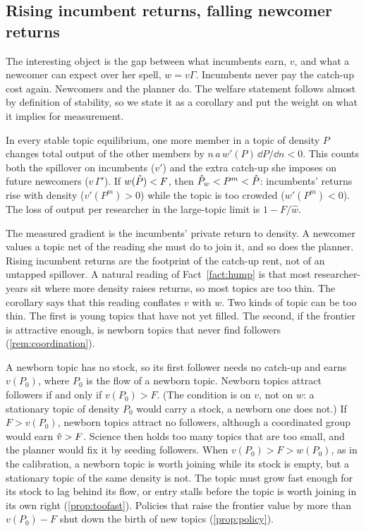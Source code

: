 \subsection{Rising incumbent returns, falling newcomer returns}

The interesting object is the gap between what incumbents earn, $v$, and what a
newcomer can expect over her spell, $w=v\Gamma$. Incumbents never pay the
catch-up cost again. Newcomers and the planner do. The welfare statement
follows almost by definition of stability, so we state it as a corollary and
put the weight on what it implies for measurement.

\begin{corollary}\label{cor:overcrowd}
In every stable topic equilibrium, one more member in a topic of density $P$
changes total output of the other members by $n\,a\,w'(P)\,\dd P/\dd n<0$.
This counts both the spillover on incumbents ($v'$) and the extra catch-up she
imposes on future newcomers ($v\,\Gamma'$). If $w(\hat P)<F$, then
$\hat P_w<P^m<\hat P$: incumbents' returns rise with density ($v'(P^m)>0$) while
the topic is too crowded ($w'(P^m)<0$). The loss of output per researcher in
the large-topic limit is $1-F/\hat w$.
\end{corollary}

The measured gradient is the incumbents' private return to density. A
newcomer values a topic net of the reading she must do to join it, and so does
the planner. Rising incumbent returns are the footprint of the catch-up rent,
not of an untapped spillover. A natural reading of Fact~\ref{fact:hump} is that
most researcher-years sit where more density raises returns, so most topics are
too thin. The corollary says that this reading conflates $v$ with $w$. Two
kinds of topic can be too thin. The first is young topics that have not yet
filled. The second, if the frontier is attractive enough, is newborn topics that
never find followers (\cref{rem:coordination}).

\begin{remark}\label{rem:coordination}
A newborn topic has no stock, so its first follower needs no catch-up and
earns $v(P_0)$, where $P_0$ is the flow of a newborn topic. Newborn topics
attract followers if and only if $v(P_0)>F$. (The condition is on $v$, not on
$w$: a stationary topic of density $P_0$ would carry a stock, a newborn one
does not.) If $F>v(P_0)$, newborn topics attract no followers, although a
coordinated group would earn $\hat v>F$. Science then holds too many topics that
are too small, and the planner would fix it by seeding followers. When
$v(P_0)>F>w(P_0)$, as in the calibration, a newborn topic is worth joining
while its stock is empty, but a stationary topic of the same density is not.
The topic must grow fast enough for its stock to lag behind its flow, or
entry stalls before the topic is worth joining in its own right
(\cref{prop:toofast}). Policies that raise the frontier value by more than
$v(P_0)-F$ shut down the birth of new topics (\cref{prop:policy}).
\end{remark}

